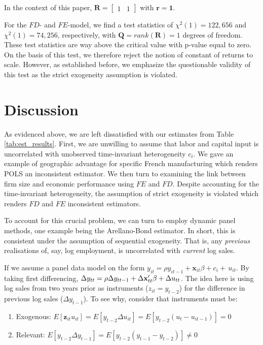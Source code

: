 \documentclass[11pt]{article}
\begin{document}
In the context of this paper, $\mathbf{R}=\left[
    \begin{array}{ll}
    1 & 1 
    \end{array}\right]$ with $\mathbf{r=1}$. 

For the $FD$- and $FE$-model, we find a test statistics of $\chi^2 (1)=122,656$  and $\chi^2 (1)=74,256$, respectively, with $\mathbf{Q}=rank(\mathbf{R})=1$ degrees of freedom. These test statistics are way above the critical value with p-value equal to zero. On the basis of this test, we therefore reject the notion of constant of returns to scale. However, as established before, we emphasize the questionable validity of this test as the strict exogeneity assumption is violated.

\section{Discussion}
As evidenced above, we are left dissatisfied with our estimates from Table \ref{tab:est_results}. First, we are unwilling to assume that labor and capital input is uncorrelated with unobserved time-invariant heterogeneity $c_i$. We gave an example of geographic advantage for specific French manufacturing which renders POLS an inconsistent estimator. We then turn to examining the link between firm size and economic performance using $FE$ and $FD$. Despite accounting for the time-invariant heterogeneity, the assumption of strict exogeneity is violated which renders $FD$ and $FE$ inconsistent estimators. 

To account for this crucial problem, we can turn to employ dynamic panel methods, one example being the Arellano-Bond estimator. In short, this is consistent under the assumption of sequential exogeneity. That is, any \textit{previous} realisations of, say, log employment, is uncorrelated with \textit{current} log sales.

If we assume a panel data model on the form $y_{i t}=\rho y_{i t-1}+\mathbf{x}_{i t}\beta+c_{i}+\,u_{i t}$. By taking first differencing, $\Delta y_{t t}=\rho\Delta y_{t t-1}+\Delta{\bf x}_{t t}^{\prime}\beta+\Delta u_{t t}$. The idea here is using log sales from two years prior as instruments ($z_{it}=y_{t-2}$) for the difference in previous log sales ($\Delta y_{t-1}$). To see why, consider that instruments must be:

\begin{enumerate}
    \item Exogenous: $E\left[\mathbf{z}_{i t} u_{i t}\right]=E\left[y_{t-2}\Delta u_{it}\right]=E\left[y_{t-2} (u_{t}-u_{i t-1})\right]=0$
    \item Relevant: $E\left[y_{t-2}\Delta y_{t-1}\right]=E\left[y_{t-2}(y_{t-1}-y_{t-2})\right]\neq 0$
\end{enumerate}
\end{document}
